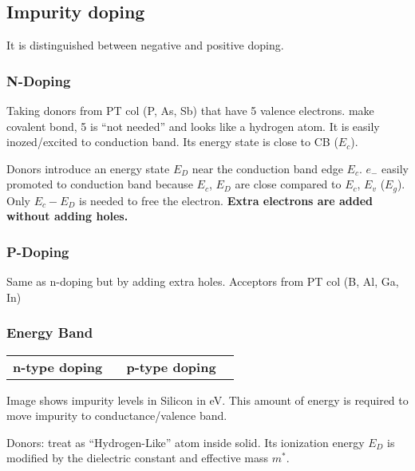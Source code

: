 \documentclass[a4paper, fontsize=8pt, landscape, DIV=1]{scrartcl}
\begin{document}
\begin{multicols*}{4}
  \subsection{Impurity doping}
  It is distinguished between negative and positive doping.
  
  \subsubsection{N-Doping}
  Taking donors from PT col  (P, As, Sb) that have 5 valence electrons.
  \ifdefined\makeultracompact{} make covalent bond, 5 is ``not needed'' and looks like a hydrogen atom.
    It is easily inozed/excited to conduction band. Its energy state is close to CB ($E_c$).
    \attention

    Donors introduce an energy state $E_D$ near the conduction band edge $E_c$.
    $e_-$ easily promoted to conduction band because $E_c$, $E_D$ are close compared to $E_c$, $E_v$ ($E_g$).
    Only $E_c-E_D$ is needed to free the electron. \textbf{Extra electrons are added without adding holes.}
  \fi

  \subsubsection{P-Doping}
  Same as n-doping but by adding extra holes. Acceptors from PT col  (B, Al, Ga, In)

  \subsubsection{Energy Band}
    \begin{tabular}[h]{p{0.45\linewidth} | p{0.45\linewidth}}
    \textbf{n-type doping} & \textbf{p-type doping} \\
  \end{tabular}

  
  \ifdefined\makeultracompact\else
    Image shows impurity levels in Silicon in eV. 
    This amount of energy is required to move impurity to conductance/valence band.
  \fi
  
  \ifdefined\makeultracompact\else
    Donors: treat as ``Hydrogen-Like'' atom inside solid. Its ionization energy $E_D$ is modified by the dielectric constant and effective mass $m^*$.


\end{multicols*}
\end{document}

